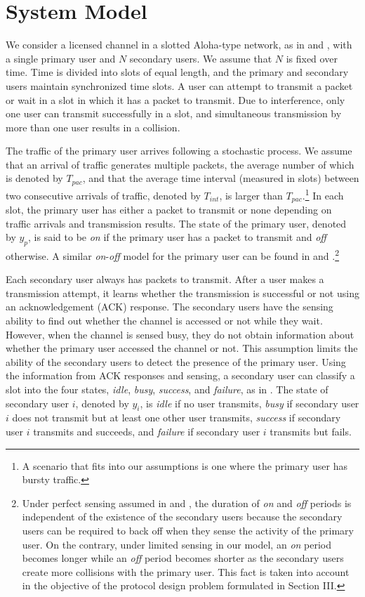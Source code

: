 \documentclass[12pt,draftclsnofoot,onecolumn]{IEEEtran}
\begin{document}
\section{System Model}

We consider a licensed channel in a slotted Aloha-type network, as in \cite{park} and \cite{ma},
with a single primary user and $N$ secondary users. We assume that $N$
is fixed over time. Time is divided into slots
of equal length,
and the primary and secondary users maintain synchronized time slots.
A user can attempt to transmit a packet or wait in a slot in which it has a packet to transmit.
Due to interference, only one user can transmit successfully in a slot, and
simultaneous transmission by more than one user results in a collision.

The traffic of the primary user arrives following a stochastic process.
We assume that an arrival of traffic generates multiple packets, the
average number of which is denoted by $T_{pac}$, and that
the average time interval (measured in slots) between two consecutive arrivals of traffic,
denoted by $T_{int}$, is larger than $T_{pac}$.\footnote{A scenario that fits into our assumptions
is one where the primary user has bursty traffic.}
In each slot, the primary user has either a packet to transmit or none depending on
traffic arrivals and transmission results.
The state of the primary user, denoted by $y_p$, is said to be \emph{on} if the primary user
has a packet to transmit and \emph{off} otherwise. A similar \emph{on}-\emph{off} model for
the primary user can be found in \cite{chou} and \cite{hkim}.\footnote{Under
perfect sensing assumed in \cite{chou} and \cite{hkim}, the
duration of \emph{on} and \emph{off} periods is independent of the existence
of the secondary users because the secondary users can be required to back off when
they sense the activity of the primary user.
On the contrary, under limited sensing in our model, an \emph{on}
period becomes longer while an \emph{off} period becomes shorter as the secondary users
create more collisions with the primary user. This fact is
taken into account in the objective of the protocol design problem formulated in Section III.}

Each secondary user always has packets to transmit.
After a user makes a transmission attempt, it learns whether the transmission is
successful or not using an acknowledgement (ACK) response.
The secondary users have the sensing ability to find out whether the channel is accessed
or not while they wait. However, when the channel is sensed busy, they do not
obtain information about whether the primary user accessed the channel or not.
This assumption limits the ability of the secondary users to detect the presence
of the primary user. Using the information from ACK responses and sensing,
a secondary user can classify a slot into the four states, \emph{idle}, \emph{busy}, \emph{success}, and \emph{failure},
as in \cite{hamed}. The state of secondary user $i$, denoted by $y_i$,
is \emph{idle} if no user transmits, \emph{busy} if secondary user $i$
does not transmit but at least one other user transmits, \emph{success} if
secondary user $i$ transmits and succeeds, and \emph{failure} if secondary user $i$ transmits
but fails.
\end{document}
